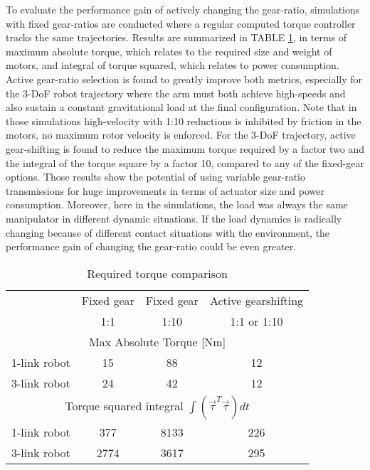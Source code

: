To evaluate the performance gain of actively changing the gear-ratio, simulations with fixed gear-ratios are conducted where a regular computed torque controller tracks the same trajectories. Results are summarized in TABLE \ref{tab:MaximumTorqueComparison}, in terms of maximum absolute torque, which relates to the required size and weight of motors, and integral of torque squared, which relates to power consumption. Active gear-ratio selection is found to greatly improve both metrics, especially for the 3-DoF robot trajectory where the arm must both achieve high-speeds and also sustain a constant gravitational load at the final configuration. Note that in those simulations high-velocity with 1:10 reductions is inhibited by friction in the motors, no maximum rotor velocity is enforced. For the 3-DoF trajectory, active gear-shifting is found to reduce the maximum torque required by a factor two and the integral of the torque square by a factor 10, compared to any of the fixed-gear options. Those results show the potential of using variable gear-ratio transmissions for huge improvements in terms of actuator size and power consumption. Moreover, here in the simulations, the load was always the same manipulator in different dynamic situations. If the load dynamics is radically changing because of different contact situations with the environment, the performance gain of changing the gear-ratio could be even greater. 
%
\begin{table}[htp]
	\centering
		\caption{Required torque comparison}
		\begin{tabular}{ c c c c }
		\hline
		     & Fixed gear & Fixed gear & Active gearshifting \\
			& 1:1 &  1:10 &  1:1 or 1:10 \\
		\hline \hline
		\multicolumn{4}{c}{ Max Absolute Torque [Nm] } \\
		\hline \hline
		1-link robot  & 15 & 88 & 12 \\	
		3-link robot  & 24 & 42 & 12 \\	
		\hline \hline
		\multicolumn{4}{c}{ Torque squared integral $\int{ ( \vec{\tau}^T \vec{\tau} ) dt }$ } \\
		\hline \hline
		1-link robot  & 377  & 8133 & 226  \\	
		3-link robot  & 2774 & 3617 & 295  \\	
		\hline \hline
		\end{tabular}
	\label{tab:MaximumTorqueComparison}
\end{table}
%



